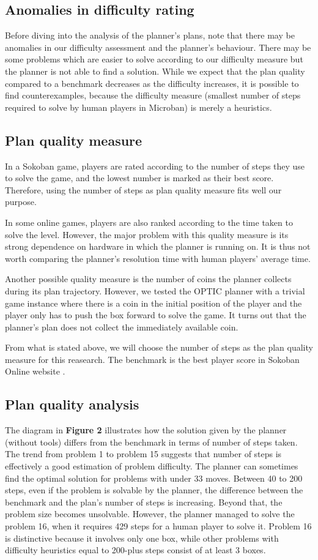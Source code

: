 \documentclass[letterpaper]{article} %
\begin{document}
\subsection{Anomalies in difficulty rating}
Before diving into the analysis of the planner's plans, note 
that there may be anomalies in our difficulty assessment 
and the planner's behaviour. There may be some problems 
which are easier to solve according to our difficulty measure but 
the planner is not able to find a solution. While we expect
that the plan quality compared to a benchmark decreases as the
difficulty increases, it is possible to find counterexamples, 
because the difficulty measure (smallest
number of steps required to solve by human players in Microban) 
is merely a heuristics. 

\subsection{Plan quality measure}
In a Sokoban game, players are rated according to the number
of steps they use to solve the game, and the lowest number 
is marked as their best score. Therefore, using the number of steps 
as plan quality measure fits well our purpose. 

In some online games, players are also ranked according to 
the time taken to solve the level. However, the major problem
with this quality measure is its strong dependence 
on hardware in which the planner is running on. 
It is thus not worth comparing the planner's resolution time 
with human players' average time. 

Another possible quality measure is the number of coins the 
planner collects during its plan trajectory. However, we tested 
the OPTIC planner with a trivial game instance where there is a 
coin in the initial position of the player and the player only 
has to push the box forward to solve the game. It turns out that
the planner's plan does not collect the immediately available coin. 

From what is stated above, we will choose the number of steps 
as the plan quality measure for this reasearch. 
The benchmark is the best player score in Sokoban Online website \cite{microban}.
\subsection{Plan quality analysis}
The diagram in \textbf{Figure 2} illustrates how the solution given by the 
planner (without tools) differs from the benchmark in terms of number 
of steps taken. The trend from problem 1 to problem 15 
suggests that number of steps is effectively a good estimation of 
problem difficulty. The planner can sometimes find the 
optimal solution for problems with under 33 moves. 
Between 40 to 200 steps, even if the problem is solvable 
by the planner, the difference between the benchmark and the 
plan's number of steps is increasing. 
Beyond that, the problem size becomes 
unsolvable. However, the planner managed to solve the
problem 16, when it requires 429 steps for a human player 
to solve it. 
Problem 16 is distinctive because 
it involves only one box, while other problems with difficulty 
heuristics equal to
200-plus steps consist of at least 3 boxes. 
\end{document}
